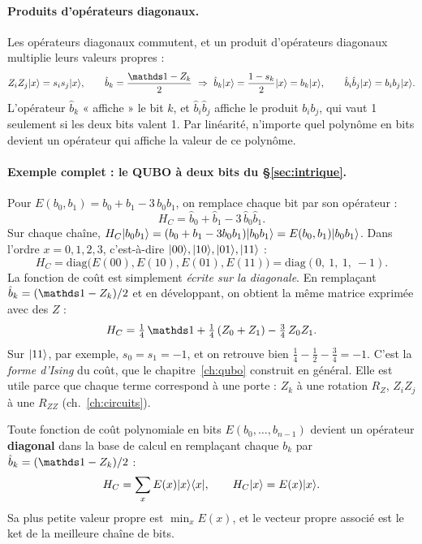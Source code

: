 \paragraph{Produits d'opérateurs diagonaux.} Les opérateurs diagonaux commutent, et un produit d'opérateurs diagonaux multiplie leurs valeurs propres :
\[
Z_iZ_j\ket x=s_is_j\ket x,\qquad \hat b_k=\frac{\Id-Z_k}2\ \Rightarrow\ \hat b_k\ket x=\frac{1-s_k}{2}\ket x=b_k\ket x,\qquad \hat b_i\hat b_j\ket x=b_ib_j\ket x .
\]
L'opérateur $\hat b_k$ « affiche » le bit $k$, et $\hat b_i\hat b_j$ affiche le produit $b_ib_j$, qui vaut 1 seulement si les deux bits valent 1. Par linéarité, n'importe quel polynôme en bits devient un opérateur qui affiche la valeur de ce polynôme.

\paragraph{Exemple complet : le QUBO à deux bits du §\ref{sec:intrique}.} Pour $E(b_0,b_1)=b_0+b_1-3\,b_0b_1$, on remplace chaque bit par son opérateur :
\[
H_C=\hat b_0+\hat b_1-3\,\hat b_0\hat b_1 .
\]
Sur chaque chaîne, $H_C\lvert b_0b_1\rangle=(b_0+b_1-3b_0b_1)\lvert b_0b_1\rangle=E(b_0,b_1)\lvert b_0b_1\rangle$. Dans l'ordre $x=0,1,2,3$, c'est-à-dire $\lvert 00\rangle,\lvert 10\rangle,\lvert 01\rangle,\lvert 11\rangle$ :
\[
H_C=\mathrm{diag}\big(E(00),E(10),E(01),E(11)\big)=\mathrm{diag}(0,\ 1,\ 1,\ -1).
\]
La fonction de coût est simplement \emph{écrite sur la diagonale}. En remplaçant $\hat b_k=(\Id-Z_k)/2$ et en développant, on obtient la même matrice exprimée avec des $Z$ :
\[
H_C=\tfrac14\,\Id+\tfrac14\,(Z_0+Z_1)-\tfrac34\,Z_0Z_1 .
\]
Sur $\lvert 11\rangle$, par exemple, $s_0=s_1=-1$, et on retrouve bien $\tfrac14-\tfrac12-\tfrac34=-1$. C'est la \emph{forme d'Ising} du coût, que le chapitre~\ref{ch:qubo} construit en général. Elle est utile parce que chaque terme correspond à une porte : $Z_k$ à une rotation $R_Z$, $Z_iZ_j$ à une $R_{ZZ}$ (ch.~\ref{ch:circuits}).

\begin{resultat}
Toute fonction de coût polynomiale en bits $E(b_0,\dots,b_{n-1})$ devient un opérateur \textbf{diagonal} dans la base de calcul en remplaçant chaque $b_k$ par $\hat b_k=(\Id-Z_k)/2$ :
\[H_C=\sum_xE(x)\lvert x\rangle\langle x\rvert,\qquad H_C\lvert x\rangle=E(x)\lvert x\rangle.\]
Sa plus petite valeur propre est $\min_xE(x)$, et le vecteur propre associé est le ket de la meilleure chaîne de bits.
\end{resultat}

